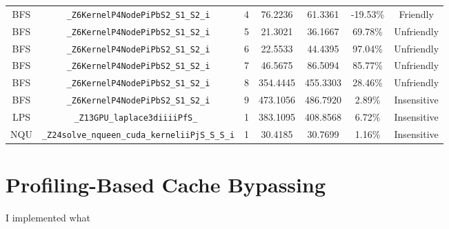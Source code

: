 \documentclass{article}
\begin{document}
\begin{table}[H]
\begin{tabular}{c c c c c c c}
BFS & \verb|_Z6KernelP4NodePiPbS2_S1_S2_i|           & 4  & 76.2236   & 61.3361  & -19.53\% &Friendly\\
BFS & \verb|_Z6KernelP4NodePiPbS2_S1_S2_i|           & 5  & 21.3021   & 36.1667  & 69.78\% &Unfriendly\\
BFS & \verb|_Z6KernelP4NodePiPbS2_S1_S2_i|           & 6  & 22.5533   & 44.4395  & 97.04\% &Unfriendly\\
BFS & \verb|_Z6KernelP4NodePiPbS2_S1_S2_i|           & 7  & 46.5675   & 86.5094  & 85.77\% &Unfriendly\\
BFS & \verb|_Z6KernelP4NodePiPbS2_S1_S2_i|           & 8  & 354.4445  & 455.3303 & 28.46\% &Unfriendly\\
BFS & \verb|_Z6KernelP4NodePiPbS2_S1_S2_i|           & 9  & 473.1056  & 486.7920 & 2.89\% &Insensitive\\
LPS & \verb|_Z13GPU_laplace3diiiiPfS_ |              & 1  & 383.1095  & 408.8568 & 6.72\% &Insensitive\\ 
NQU & \verb|_Z24solve_nqueen_cuda_kerneliiPjS_S_S_i| & 1  & 30.4185   & 30.7699  & 1.16\% &Insensitive\\
[1ex] %
\hline %
\end{tabular}
\label{table:cache} %
\end{table}

\section{Profiling-Based Cache Bypassing}
I implemented what \cite{cachebypassing}



\end{document}
